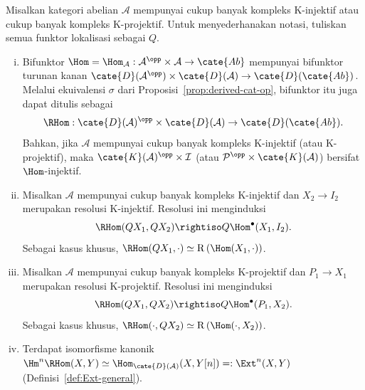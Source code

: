 \begin{teorema}\label{prop:unbounded-RHom}
	Misalkan kategori abelian $\mathcal{A}$ mempunyai cukup banyak kompleks
	K-injektif atau cukup banyak kompleks K-projektif. Untuk menyederhanakan
	notasi, tuliskan semua funktor lokalisasi sebagai $Q$.
	\begin{enumerate}[(i)]
		\item Bifunktor
		$\Hom=\Hom_{\mathcal{A}}:\mathcal{A}^{\opp}\times\mathcal{A}
		\to\cate{Ab}$ mempunyai bifunktor turunan kanan
		$\cate{D}(\mathcal{A}^{\opp})\times\cate{D}(\mathcal{A})
		\to\cate{D}(\cate{Ab})$. Melalui ekuivalensi $\sigma$ dari
		Proposisi~\ref{prop:derived-cat-op}, bifunktor itu juga dapat ditulis sebagai
		\[ \RHom: \cate{D}(\mathcal{A})^{\opp} \times \cate{D}(\mathcal{A}) \to \cate{D}(\cate{Ab}). \]
		Bahkan, jika $\mathcal{A}$ mempunyai cukup banyak kompleks K-injektif
		(atau K-projektif), maka
		$\cate{K}(\mathcal{A})^{\opp}\times\mathcal{I}$ (atau
		$\mathcal{P}^{\opp}\times\cate{K}(\mathcal{A})$) bersifat
		$\Hom$-injektif.
		\item Misalkan $\mathcal{A}$ mempunyai cukup banyak kompleks K-injektif
		dan $X_2\to I_2$ merupakan resolusi K-injektif. Resolusi ini menginduksi
		\[ \RHom(Q X_1, Q X_2) \rightiso Q \Hom^\bullet(X_1, I_2). \]
		Sebagai kasus khusus,
		$\RHom(QX_1,\cdot)\simeq
		\mathrm{R}\left(\Hom(X_1,\cdot)\right)$.
		\item Misalkan $\mathcal{A}$ mempunyai cukup banyak kompleks K-projektif
		dan $P_1\to X_1$ merupakan resolusi K-projektif. Resolusi ini menginduksi
		\[ \RHom(Q X_1, Q X_2) \rightiso Q \Hom^\bullet(P_1, X_2). \]
		Sebagai kasus khusus,
		$\RHom(\cdot,QX_2)\simeq
		\mathrm{R}\left(\Hom(\cdot,X_2)\right)$.
		\item Terdapat isomorfisme kanonik
		$\Hm^n\RHom(X,Y)\simeq
		\Hom_{\cate{D}(\mathcal{A})}(X,Y[n])=: \Ext^n(X,Y)$
		(Definisi~\ref{def:Ext-general}).
	\end{enumerate}
\end{teorema}
